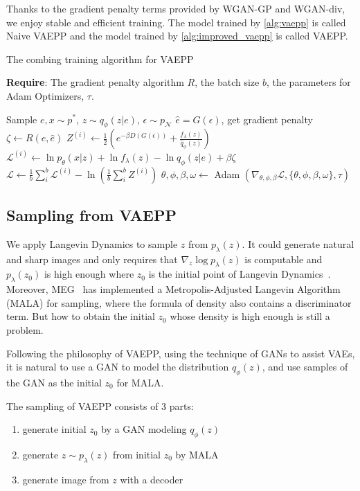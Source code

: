 Thanks to the gradient penalty terms provided by WGAN-GP and WGAN-div, we enjoy stable and efficient training. The model trained by \cref{alg:vaepp} is called Naive VAEPP and the model trained by \cref{alg:improved_vaepp} is called VAEPP. 
\begin{algorithm}[tb]
\caption{The combing training algorithm for VAEPP}
\label{alg:improved_vaepp}
\textbf{Require}: The gradient penalty algorithm $R$, the batch size $b$, the parameters for Adam Optimizers, $\tau$. 

\begin{algorithmic}[1] %
\STATE Sample $e, x \sim p^*$, $z \sim q_\phi(z|e)$, $\epsilon \sim p_\mathcal{N}$
\STATE $\hat{e} = G(\epsilon)$, get gradient penalty $\zeta \gets R(e, \hat{e})$ 
\STATE $Z^{(i)} \gets \frac{1}{2}(e^{-\beta D(G(\epsilon))} + \frac{f_\lambda(z)}{\hat{q}_\phi(z)})$
\STATE $\mathcal{L}^{(i)} \gets \ln p_\theta(x|z) + \ln f_\lambda(z) - \ln q_\phi(z|e) + \beta \zeta$
\ENDFOR
\STATE $\mathcal{L} \gets \frac{1}{b}\sum_{i}^b \mathcal{L}^{(i)} - \ln (\frac{1}{b}\sum_{i}^b Z^{(i)})$
\STATE $\theta, \phi, \beta, \omega \gets $ Adam $(\nabla_{\theta, \phi, \beta} \mathcal{L}, \{\theta, \phi, \beta, \omega\}, \tau)$
\ENDWHILE
\end{algorithmic}
\end{algorithm}

\subsection{Sampling from VAEPP}
We apply Langevin Dynamics to sample $z$ from $p_\lambda(z)$. It could generate natural and sharp images and only requires that $\nabla_z \log p_\lambda(z)$ is computable and $p_\lambda(z_0)$ is high enough where $z_0$ is the initial point of Langevin Dynamics~\cite{song2019generative}. 
Moreover, MEG~\cite{kumar2019maximum} has implemented a Metropolis-Adjusted Langevin Algorithm (MALA) for sampling, where the formula of density also contains a discriminator term. 
But how to obtain the initial $z_0$ whose density is high enough is still a problem. 

Following the philosophy of VAEPP, \IE using the technique of GANs to assist VAEs, it is natural to use a GAN to model the distribution $q_\phi(z)$, and use samples of the GAN as the initial $z_0$ for MALA. 

The sampling of VAEPP consists of 3 parts: 
\begin{enumerate}
	\item generate initial $z_0$ by a GAN modeling $q_\phi(z)$
	\item generate $z \sim p_\lambda(z)$ from initial $z_0$ by MALA
	\item generate image from $z$ with a decoder
\end{enumerate}

